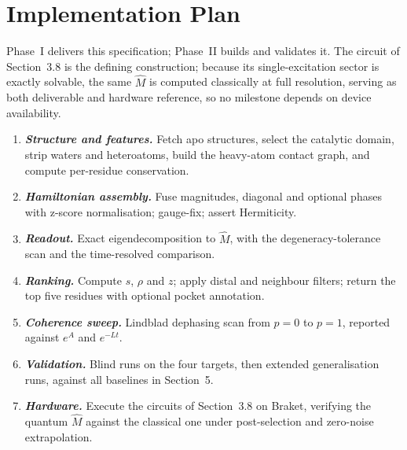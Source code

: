 \documentclass[10pt,a4paper]{article}
\newcommand{\Mhat}{\hat{M}}
\newcommand{\lead}[1]{\textbf{\textit{#1}}}
\begin{document}
\section{Implementation Plan}

Phase~I delivers this specification; Phase~II builds and validates it. The circuit of Section~3.8 is
the defining construction; because its single-excitation sector is exactly solvable, the same $\Mhat$
is computed classically at full resolution, serving as both deliverable and hardware reference, so no
milestone depends on device availability.

\begin{enumerate}
\item \lead{Structure and features.} Fetch apo structures, select the catalytic domain, strip waters
      and heteroatoms, build the heavy-atom contact graph, and compute per-residue conservation.
\item \lead{Hamiltonian assembly.} Fuse magnitudes, diagonal and optional phases with z-score
      normalisation; gauge-fix; assert Hermiticity.
\item \lead{Readout.} Exact eigendecomposition to $\Mhat$, with the degeneracy-tolerance scan and the
      time-resolved comparison.
\item \lead{Ranking.} Compute $s$, $\rho$ and $z$; apply distal and neighbour filters; return the top
      five residues with optional pocket annotation.
\item \lead{Coherence sweep.} Lindblad dephasing scan from $p = 0$ to $p = 1$, reported against
      $e^{A}$ and $e^{-Lt}$.
\item \lead{Validation.} Blind runs on the four targets, then extended generalisation runs, against
      all baselines in Section~5.
\item \lead{Hardware.} Execute the circuits of Section~3.8 on Braket, verifying the quantum $\Mhat$
      against the classical one under post-selection and zero-noise extrapolation.
\end{enumerate}
\end{document}
